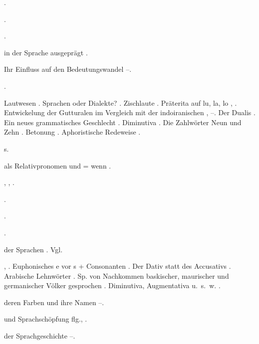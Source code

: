 \begin{register}
 \pageref{sp.157}.

 \pageref{sp.314}.

 \pageref{sp.101}.

 in der Sprache ausgeprägt \pageref{sp.413}.

 Ihr Einfluss auf den Bedeutungswandel \pageref{sp.245}–\pageref{sp.250}.


 \pageref{sp.45}.

 Lautwesen \pageref{sp.34}. Sprachen oder Dialekte? \pageref{sp.54}. Zischlaute \pageref{sp.148}. Präterita auf lu, la, lo \pageref{sp.159}, \pageref{sp.384}. Entwickelung der Gutturalen im Vergleich mit der indoiranischen \pageref{sp.159}, \pageref{sp.164}–\pageref{sp.165}. Der Dualis \pageref{sp.254}. Ein neues grammatisches Geschlecht \pageref{sp.254}. Diminutiva \pageref{sp.277}.  Die Zahlwörter Neun und Zehn \pageref{sp.402}. Betonung \pageref{sp.431}. Aphoristische Redeweise \pageref{sp.465}.

 s. 

 als Relativpronomen und = wenn \pageref{sp.100}.


 \pageref{sp.160}, \pageref{sp.282}, \pageref{sp.307}.

 \pageref{sp.186}.

 \pageref{sp.282}.

 \pageref{sp.282}.

 der Sprachen \pageref{sp.138}. Vgl. 

 \pageref{sp.8}, \pageref{sp.54}. Euphonisches e vor s + Consonanten \pageref{sp.157}. Der Dativ statt des Accusativs \pageref{sp.255}. Arabische Lehnwörter \pageref{sp.266}. Sp. von Nachkommen baskischer, maurischer und germanischer Völker gesprochen \pageref{sp.293}. Diminutiva, Augmentativa u.~s.~w. \pageref{sp.445}.

 deren Farben und ihre Namen \pageref{sp.233}–\pageref{sp.234}.

 und Sprachschöpfung \pageref{sp.308} flg., \pageref{sp.361}.

 der Sprachgeschichte \pageref{sp.255}–\pageref{sp.258}.


\end{register}
